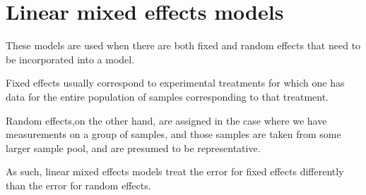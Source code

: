 

\section{Linear mixed effects models}

These models are used when there are both fixed and random effects that need to be incorporated into a model.

Fixed effects usually correspond to experimental treatments for which one has data for the entire population of samples corresponding to that treatment.

Random effects,on the other hand, are assigned in the case where we have measurements on a group of samples, and those
samples are taken from some larger sample pool, and are presumed to be representative.

As such, linear mixed effects models treat the error for fixed effects differently than the error for random effects.


